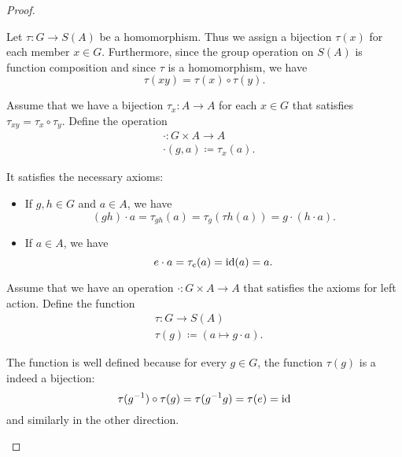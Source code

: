 \begin{proof}
  \begin{description}
     Let \( \tau: G \to S(A) \) be a homomorphism. Thus we assign a bijection \( \tau(x) \) for each member \( x \in G \). Furthermore, since the group operation on \( S(A) \) is function composition and since \( \tau \) is a homomorphism, we have
    \begin{equation*}
      \tau(xy) = \tau(x) \circ \tau(y).
    \end{equation*}

     Assume that we have a bijection \( \tau_x: A \to A \) for each \( x \in G \) that satisfies \( \tau_{xy} = \tau_x \circ \tau_y \). Define the operation
    \begin{align*}
      &\cdot: G \times A \to A \\
      &\cdot(g, a) \coloneqq \tau_x(a).
    \end{align*}

    It satisfies the necessary axioms:
    \begin{itemize}
      \item If \( g, h \in G \) and \( a \in A \), we have
      \begin{equation*}
        (g h) \cdot a
        =
        \tau_{g h}(a)
        =
        \tau_{g}(\tau{h}(a))
        =
        g \cdot (h \cdot a).
      \end{equation*}

      \item If \( a \in A \), we have
      \begin{equation*}
        e \cdot a
        =
        \tau_e(a)
        =
        \operatorname{id}(a)
        =
        a.
      \end{equation*}
    \end{itemize}

     Assume that we have an operation \( \cdot: G \times A \to A \) that satisfies the axioms for left action. Define the function
    \begin{align*}
      &\tau: G \to S(A) \\
      &\tau(g) \coloneqq (a \mapsto g \cdot a).
    \end{align*}

    The function is well defined because for every \( g \in G \), the function \( \tau(g) \) is a indeed a bijection:
    \begin{equation*}
      \tau(g^{-1}) \circ \tau(g)
      =
      \tau(g^{-1} g)
      =
      \tau(e)
      =
      \operatorname{id}
    \end{equation*}
    and similarly in the other direction.


\end{description}
\end{proof}
